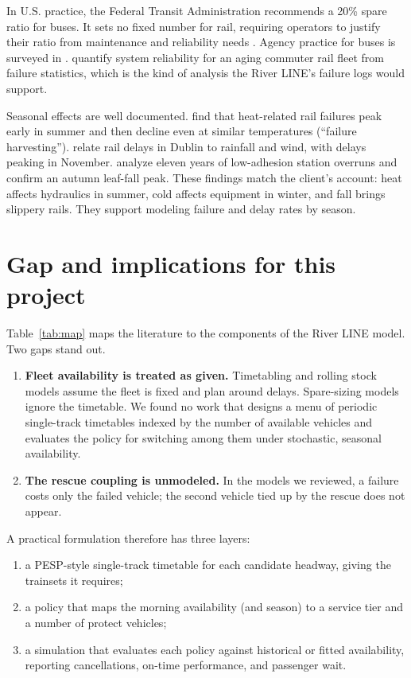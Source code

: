 \documentclass[11pt]{article}
\begin{document}
In U.S. practice, the Federal Transit Administration recommends a 20\% spare ratio for buses. It sets no fixed number for rail, requiring operators to justify their ratio from maintenance and reliability needs \citep{fta2015op37}. Agency practice for buses is surveyed in \citet{tcrp2014spare}. \citet{conradie2015quantifying} quantify system reliability for an aging commuter rail fleet from failure statistics, which is the kind of analysis the River LINE's failure logs would support.

Seasonal effects are well documented. \citet{ferranti2016heat} find that heat-related rail failures peak early in summer and then decline even at similar temperatures (``failure harvesting''). \citet{brazil2017weather} relate rail delays in Dublin to rainfall and wind, with delays peaking in November. \citet{white2023yearround} analyze eleven years of low-adhesion station overruns and confirm an autumn leaf-fall peak. These findings match the client's account: heat affects hydraulics in summer, cold affects equipment in winter, and fall brings slippery rails. They support modeling failure and delay rates by season.

\section{Gap and implications for this project}

Table~\ref{tab:map} maps the literature to the components of the River LINE model. Two gaps stand out.
\begin{enumerate}
\item \textbf{Fleet availability is treated as given.} Timetabling and rolling stock models assume the fleet is fixed and plan around delays. Spare-sizing models ignore the timetable. We found no work that designs a menu of periodic single-track timetables indexed by the number of available vehicles and evaluates the policy for switching among them under stochastic, seasonal availability.
\item \textbf{The rescue coupling is unmodeled.} In the models we reviewed, a failure costs only the failed vehicle; the second vehicle tied up by the rescue does not appear.
\end{enumerate}

A practical formulation therefore has three layers:
\begin{enumerate}
\item a PESP-style single-track timetable for each candidate headway, giving the trainsets it requires;
\item a policy that maps the morning availability (and season) to a service tier and a number of protect vehicles;
\item a simulation that evaluates each policy against historical or fitted availability, reporting cancellations, on-time performance, and passenger wait.
\end{enumerate}
\end{document}
